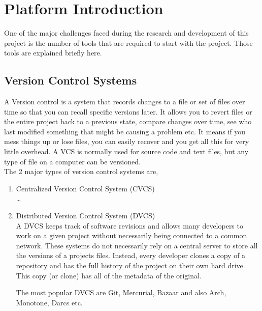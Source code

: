 \chapter{Platform Introduction}

One of the major challenges faced during the research and development
of this project is the number of tools that are required to start with
the project. Those tools are explained briefly here.

\section{Version Control Systems}

A Version control is a system that records changes to a file or set of
files over time so that you can recall specific versions later. It
allows you to revert files or the entire project back to a previous
state, compare changes over time, see who last modified something that
might be causing a problem etc. It means if you mess things up or lose
files, you can easily recover and you get all this for very little
overhead. A VCS is normally used for source code and
text files, but any type of file on a computer can be versioned. \\


The 2 major types of version control systems are,

\begin{enumerate}

\item{Centralized Version Control System (CVCS)}  \hfill \\
  \ldots
\item{Distributed Version Control System (DVCS)}  \hfill \\
  A DVCS keeps track of software revisions and allows many developers
  to work on a given project without necessarily being connected to a
  common network. These systems do not necessarily rely on a central
  server to store all the versions of a projects files. Instead, every
  developer clones a copy of a repository and has the full history of
  the project on their own hard drive. This copy (or clone) has all of
  the metadata of the original.

  The most popular DVCS are Git, Mercurial, Bazaar and also Arch,
  Monotone, Darcs etc.
\end{enumerate}
